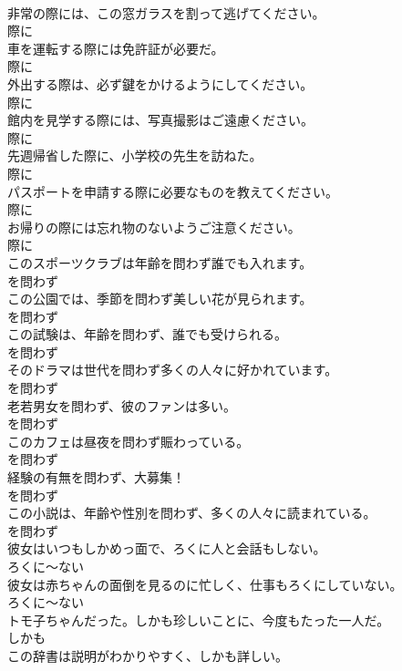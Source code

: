 \documentclass[8pt]{extreport}
\begin{document}
\begin{CJK}{UTF8}{min}
\\	非常の際には、この窓ガラスを割って逃げてください。	
\\	際に	
\\	車を運転する際には免許証が必要だ。	
\\	際に	
\\	外出する際は、必ず鍵をかけるようにしてください。	
\\	際に	
\\	館内を見学する際には、写真撮影はご遠慮ください。	
\\	際に	
\\	先週帰省した際に、小学校の先生を訪ねた。	
\\	際に	
\\	パスポートを申請する際に必要なものを教えてください。	
\\	際に	
\\	お帰りの際には忘れ物のないようご注意ください。	
\\	際に	
\\	このスポーツクラブは年齢を問わず誰でも入れます。	
\\	を問わず	
\\	この公園では、季節を問わず美しい花が見られます。	
\\	を問わず	
\\	この試験は、年齢を問わず、誰でも受けられる。	
\\	を問わず	
\\	そのドラマは世代を問わず多くの人々に好かれています。	
\\	を問わず	
\\	老若男女を問わず、彼のファンは多い。	
\\	を問わず	
\\	このカフェは昼夜を問わず賑わっている。	
\\	を問わず	
\\	経験の有無を問わず、大募集！	
\\	を問わず	
\\	この小説は、年齢や性別を問わず、多くの人々に読まれている。	
\\	を問わず	
\\	彼女はいつもしかめっ面で、ろくに人と会話もしない。	
\\	ろくに～ない	
\\	彼女は赤ちゃんの面倒を見るのに忙しく、仕事もろくにしていない。	
\\	ろくに～ない	
\\	トモ子ちゃんだった。しかも珍しいことに、今度もたった一人だ。	
\\	しかも	
\\	この辞書は説明がわかりやすく、しかも詳しい。	

\end{CJK}
\end{document}
